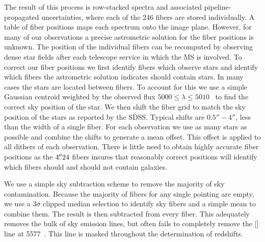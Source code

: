 The result of this process is row-stacked spectra and associated pipeline-propagated uncertainties, where each of the 246 fibers are stored individually. A table of fiber positions maps each spectrum onto the image plane. However, for many of our observations a precise astrometric solution for the fiber positions is unknown. The position of the individual fibers can be recomputed by observing dense star fields after each telescope service in which the MS is involved. To correct our fiber positions we first identify fibers which observe stars and identify which fibers the astrometric solution indicates should contain stars. In many cases the stars are located between fibers. To account for this we use a simple Gaussian centroid weighted by the observed flux $5000 \leq \lambda \leq 5010$ \AAA\ to find the correct sky position of the star. We then shift the fiber grid to match the sky position of the stars as reported by the SDSS. Typical shifts are $0.5'' - 4''$, less than the width of a single fiber. For each observation we use as many stars as possible and combine the shifts to generate a mean offset. This offset is applied to all dithers of each observation. There is little need to obtain highly accurate fiber positions as the $4\mbox{\ensuremath{.\!\!^{\prime\prime}}}24$ fibers insures that reasonably correct positions will identify which fibers should and should not contain galaxies.

We use a simple sky subtraction scheme to remove the majority of sky contamination. Because the majority of fibers for any single pointing are empty, we use a $3\sigma$ clipped median selection to identify sky fibers and a simple mean to combine them. The result is then subtracted from every fiber. This adequately removes the bulk of sky emission lines, but often fails to completely remove the \hbox{[]} line at 5577~\AAA. This line is masked throughout the determination of redshifts.

